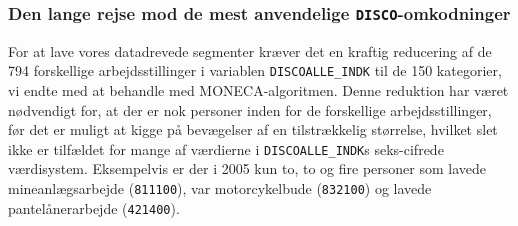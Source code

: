 \subsubsection{Den lange rejse mod de mest anvendelige \texttt{DISCO}-omkodninger} \label{disco_omkodninger}

For at lave vores datadrevede segmenter kræver det en kraftig reducering af de 794 forskellige arbejdsstillinger i variablen \texttt{DISCOALLE\_INDK} til de 150 kategorier, vi endte med at behandle med MONECA-algoritmen. Denne reduktion har været nødvendigt for, at der er nok personer inden for de forskellige arbejdsstillinger, før det er muligt at kigge på bevægelser af en tilstrækkelig størrelse, hvilket slet ikke er tilfældet for mange af værdierne i \texttt{DISCOALLE\_INDK}s seks-cifrede værdisystem. Eksempelvis er der i 2005 kun to, to og fire personer som lavede mineanlægsarbejde (\texttt{811100}), var motorcykelbude (\texttt{832100}) og lavede pantelånerarbejde (\texttt{421400}).

